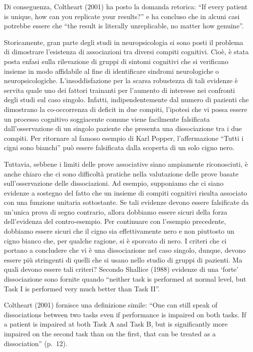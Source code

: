 \documentclass[
  11pt,
]{krantz}
\theoremstyle{definition}
\theoremstyle{definition}
\theoremstyle{definition}
\theoremstyle{definition}
\theoremstyle{remark}
\begin{document}
Di conseguenza, Coltheart (2001) ha posto la domanda retorica: ``If every patient is unique, how can you replicate your results?'' e ha concluso che in alcuni casi potrebbe essere che ``the result is literally unreplicable, no matter how genuine''.

Storicamente, gran parte degli studi in neuropsicologia si sono posti il problema di dimostrare l'esistenza di associazioni tra diversi compiti cognitivi. Cioè, è stata posta enfasi sulla rilevazione di gruppi di sintomi cognitivi che si verificano insieme in modo affidabile al fine di identificare sindromi neurologiche o neuropsicologiche. L'insoddisfazione per la scarsa robustezza di tali evidenze è servita quale uno dei fattori trainanti per l'aumento di interesse nei confronti degli studi sul caso singolo. Infatti, indipendentemente dal numero di pazienti che dimostrano la co-occorrenza di deficit in due compiti, l'ipotesi che vi possa essere un processo cognitivo soggiacente comune viene facilmente falsificata dall'osservazione di un singolo paziente che presenta una dissociazione tra i due compiti. Per ritornare al famoso esempio di Karl Popper, l'affermazione ``Tutti i cigni sono bianchi'' può essere falsificata dalla scoperta di un solo cigno nero.

Tuttavia, sebbene i limiti delle prove associative siano ampiamente riconosciuti, è anche chiaro che ci sono difficoltà pratiche nella valutazione delle prove basate sull'osservazione delle dissociazioni. Ad esempio, supponiamo che ci siano evidenze a sostegno del fatto che un insieme di compiti cognitivi risulta associato con una funzione unitaria sottostante. Se tali evidenze devono essere falsificate da un'unica prova di segno contrario, allora dobbiamo essere sicuri della forza dell'evidenza del contro-esempio. Per continuare con l'esempio precedente, dobbiamo essere sicuri che il cigno sia effettivamente nero e non piuttosto un cigno bianco che, per qualche ragione, si è sporcato di nero. I criteri che ci portano a concludere che vi è una dissociazione nel caso singolo, dunque, devono essere più stringenti di quelli che si usano nello studio di gruppi di pazienti. Ma quali devono essere tali criteri? Secondo Shallice (1988) evidenze di una `forte' dissociazione sono fornite quando ``neither task is performed at normal level, but Task I is performed very much better than Task II''.

Coltheart (2001) fornisce una definizione simile: ``One can still speak of dissociations between two tasks even if performance is impaired on both tasks. If a patient is impaired at both Task A and Task B, but is significantly more impaired on the second task than on the first, that can be treated as a dissociation'' (p.~12).
\end{document}
